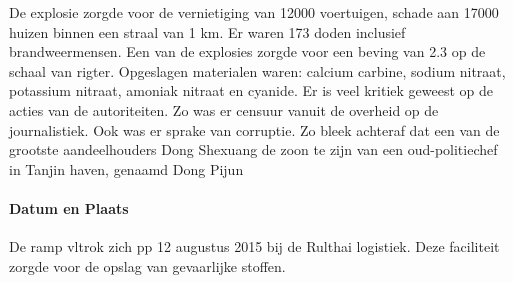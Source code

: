 \documentclass{article}
\begin{document}
	De explosie zorgde voor de vernietiging van 12000 voertuigen, schade aan 17000 huizen binnen een straal van 1 km. Er waren 173 doden inclusief brandweermensen.
	Een van de explosies zorgde voor  een beving van 2.3 op de schaal van rigter.
	Opgeslagen materialen  waren: calcium carbine, sodium nitraat, potassium nitraat, amoniak nitraat en cyanide.
	Er is veel kritiek geweest op de acties van de autoriteiten. Zo was er censuur vanuit de overheid op de journalistiek.
	Ook was er  sprake van corruptie. Zo bleek achteraf dat een van de grootste aandeelhouders Dong Shexuang de zoon te zijn van een oud-politiechef in Tanjin haven, genaamd Dong Pijun
	\paragraph{Datum en Plaats} 	\newline \indent 
	De ramp vltrok zich pp 12 augustus 2015  bij de Rulthai logistiek. Deze faciliteit zorgde voor de opslag van  gevaarlijke stoffen.
	
\end{document}

